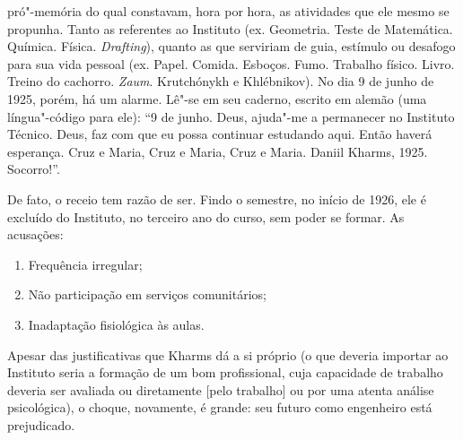 pró"-memória do qual constavam, hora por hora, as atividades que
ele mesmo se propunha. Tanto as referentes ao Instituto (ex.
Geometria. Teste de Matemática. Química. Física. \emph{Drafting}),
quanto as que serviriam de guia, estímulo ou desafogo para sua
vida pessoal (ex. Papel. Comida. Esboços. Fumo. Trabalho físico.
Livro. Treino do cachorro. \emph{Zaum}. Krutchónykh e Khlébnikov).
No dia 9 de junho de 1925, porém, há um alarme. Lê"-se em seu
caderno, escrito em alemão (uma língua"-código para ele): ``9 de
junho. Deus, ajuda"-me a permanecer no Instituto Técnico. Deus,
faz com que eu possa continuar estudando aqui. Então haverá
esperança. Cruz e Maria, Cruz e Maria, Cruz e Maria. Daniil
Kharms, 1925. Socorro!''.

De fato, o receio tem razão de ser. Findo o semestre, no início
de 1926, ele é excluído do Instituto, no terceiro ano do curso,
sem poder se formar. As acusações:

\pagebreak

\begin{enumerate}
\item{}Frequência irregular;
\item{}Não participação em serviços comunitários;
\item{}Inadaptação fisiológica às aulas.
\end{enumerate}

Apesar das justificativas que Kharms dá a si próprio (o que
deveria importar ao Instituto seria a formação de um bom
profissional, cuja capacidade de trabalho deveria ser avaliada
ou diretamente [pelo trabalho] ou por uma atenta análise
psicológica), o choque, novamente, é grande: seu futuro como
engenheiro está prejudicado.

